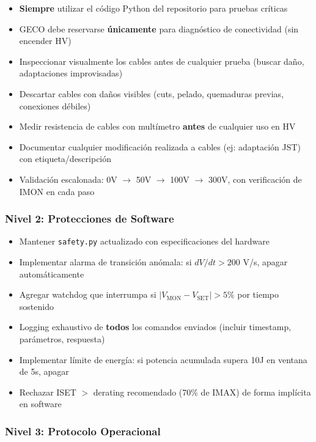 \documentclass{article}
\begin{document}
\begin{itemize}
    \item \textbf{Siempre} utilizar el código Python del repositorio para pruebas críticas
    \item GECO debe reservarse \textbf{únicamente} para diagnóstico de conectividad (sin encender HV)
    \item Inspeccionar visualmente los cables antes de cualquier prueba (buscar daño, adaptaciones improvisadas)
    \item Descartar cables con daños visibles (cuts, pelado, quemaduras previas, conexiones débiles)
    \item Medir resistencia de cables con multímetro \textbf{antes} de cualquier uso en HV
    \item Documentar cualquier modificación realizada a cables (ej: adaptación JST) con etiqueta/descripción
    \item Validación escalonada: 0V $\rightarrow$ 50V $\rightarrow$ 100V $\rightarrow$ 300V, con verificación de IMON en cada paso
\end{itemize}

\subsubsection{Nivel 2: Protecciones de Software}

\begin{itemize}
    \item Mantener \texttt{safety.py} actualizado con especificaciones del hardware
    \item Implementar alarma de transición anómala: si \(dV/dt > 200\) V/s, apagar automáticamente
    \item Agregar watchdog que interrumpa si \(|V_{\text{MON}} - V_{\text{SET}}| > 5\%\) por tiempo sostenido
    \item Logging exhaustivo de \textbf{todos} los comandos enviados (incluir timestamp, parámetros, respuesta)
    \item Implementar límite de energía: si potencia acumulada supera 10J en ventana de 5s, apagar
    \item Rechazar ISET $>$ derating recomendado (70\% de IMAX) de forma implícita en software
\end{itemize}

\subsubsection{Nivel 3: Protocolo Operacional}
\end{document}
